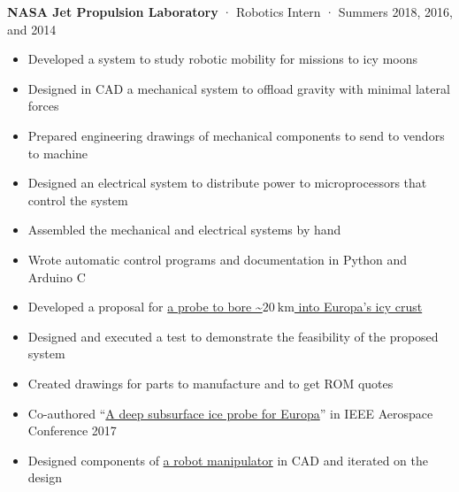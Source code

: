 \documentclass[12pt, oneside]{article}
\newcommand{\jobtitle}[3] {
	{\bf #1} · {#2} · {#3} \vspace{-7pt} \\
}
\begin{document}
\begin{flushleft}
\jobtitle{NASA Jet Propulsion Laboratory}{Robotics Intern}{Summers 2018, 2016, and 2014}
\begin{itemize}
	\item Developed a system to study robotic mobility for missions to icy moons \\
	\item Designed in CAD a mechanical system to offload gravity with minimal lateral forces \\
	\item Prepared engineering drawings of mechanical components to send to vendors to machine \\
	\item Designed an electrical system to distribute power to microprocessors that control the system \\
	\item Assembled the mechanical and electrical systems by hand \\
	\item Wrote automatic control programs and documentation in Python and Arduino C \\
	\item Developed a proposal for \href{https://blog.fletcherporter.com/blog/owms/}{a probe to bore \textasciitilde$\SI{20}{\kilo\meter}$ into Europa's icy crust} \\
	\item Designed and executed a test to demonstrate the feasibility of the proposed system \\
	\item Created drawings for parts to manufacture and to get ROM quotes \\
	\item Co-authored ``\href{https://www.researchgate.net/publication/317702124_A_deep_subsurface_ice_probe_for_Europa}{A deep subsurface ice probe for Europa}'' in IEEE Aerospace Conference 2017 \\
	\item Designed components of \href{https://blog.fletcherporter.com/blog/hand-disaster-recovery-robot/}{a robot manipulator} in CAD and iterated on the design
\end{itemize}


\end{flushleft}
\end{document}
